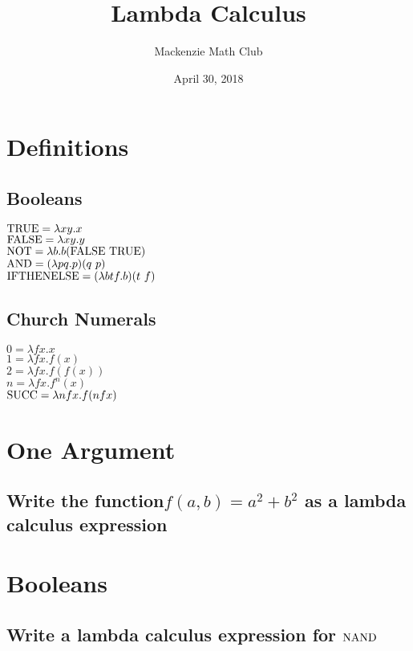 


\title{Lambda Calculus}
\author{Mackenzie Math Club}
\date{April 30, 2018}



	\section*{Definitions}
		\begin{minipage}{0.5\textwidth}
			\subsection*{Booleans}
			$\mathrm{TRUE} = \lambda xy.x$\\
			$\mathrm{FALSE} = \lambda xy.y$\\
			$\NOT = \lambda b . b (\FALSE\ \TRUE)$\\
			$\mathrm{AND} = (\lambda pq . p) (q\ p)$\\
			$\IFTHENELSE = (\lambda btf . b) (t\ f)$
		\end{minipage}
		\begin{minipage}{0.5\textwidth}
			\subsection*{Church Numerals}
			$0 = \lambda fx.x$\\
			$1 = \lambda fx.f(x)$\\
			$2 = \lambda fx.f(f(x))$\\
			$n = \lambda fx.f^n (x)$\\
			$\mathrm{SUCC} = \lambda nfx.f (nfx)$
		\end{minipage}
	\section{One Argument}
		\subsection{Write the function$f(a, b) = a^2 + b^2$ as a lambda calculus expression}
		\solutionspace{1in}
	\section{Booleans}
		\subsection{Write a lambda calculus expression for $\mathrm{NAND}$}
		\solutionspace{1in}

